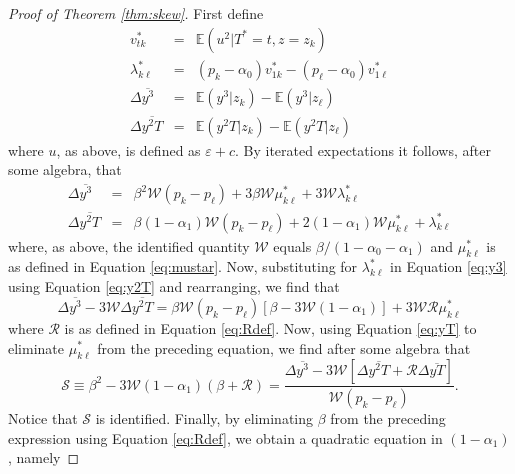 \begin{proof}[Proof of Theorem \ref{thm:skew}]
  First define 
  \begin{eqnarray}
    \label{eq:vstar}
  v^*_{tk} &=&  \mathbb{E}(u^2|T^*=t, z = z_k)\\
    \label{eq:lambda}
  \lambda_{k\ell}^* &=& (p_k - \alpha_0) v_{1k}^* - (p_\ell - \alpha_0) v_{1\ell}^*\\
    \label{eq:y3def}
    \Delta\overline{y^3} &=&  \mathbb{E}(y^3|z_k) - \mathbb{E}(y^3|z_\ell)\\
    \label{eq:y2Tdef}
    \Delta\overline{y^2T} &=&  \mathbb{E}(y^2T|z_k) - \mathbb{E}(y^2T|z_\ell)
  \end{eqnarray}
  where $u$, as above, is defined as $\varepsilon + c$.
  By iterated expectations it follows, after some algebra, that
  \begin{eqnarray}
    \label{eq:y3}
    \Delta\overline{y^3} &=& \beta^2 \mathcal{W} (p_k - p_\ell)  + 3 \beta \mathcal{W} \mu_{k\ell}^* + 3 \mathcal{W} \lambda^*_{k\ell}\\
    \label{eq:y2T}
    \Delta\overline{y^2T} &=& \beta(1-\alpha_1)\mathcal{W}(p_k - p_\ell) + 2(1-\alpha_1)\mathcal{W}\mu_{k\ell}^* + \lambda_{k\ell}^* 
  \end{eqnarray}
  where, as above, the identified quantity $\mathcal{W}$ equals $\beta/(1 - \alpha_0 - \alpha_1)$ and $\mu_{k\ell}^*$ is as defined in Equation \ref{eq:mustar}.
  Now, substituting for $\lambda^*_{k\ell}$ in Equation \ref{eq:y3} using Equation \ref{eq:y2T} and rearranging, we find that
  \begin{equation}
    \Delta \overline{y^3} - 3 \mathcal{W} \Delta\overline{y^2T} = \beta \mathcal{W} (p_k - p_\ell)\left[ \beta - 3 \mathcal{W} (1-\alpha_1) \right]+ 3\mathcal{W}\mathcal{R}\mu^*_{k\ell}
    \label{eq:diffy3}
  \end{equation}
  where $\mathcal{R}$ is as defined in Equation \ref{eq:Rdef}.
  Now, using Equation \ref{eq:yT} to eliminate $\mu_{k\ell}^*$ from the preceding equation, we find after some algebra that 
  \begin{equation}
    \mathcal{S} \equiv \beta^2 - 3\mathcal{W}(1-\alpha_1) (\beta + \mathcal{R}) = \frac{\Delta\overline{y^3} - 3 \mathcal{W}\left[ \Delta\overline{y^2T}+\mathcal{R}\Delta\overline{yT} \right]}{\mathcal{W}(p_k - p_\ell)}.
    \label{eq:Sdef}
  \end{equation}
  Notice that $\mathcal{S}$ is identified.
  Finally, by eliminating $\beta$ from the preceding expression using Equation \ref{eq:Rdef}, we obtain a quadratic equation in $(1-\alpha_1)$, namely 

\end{proof}
